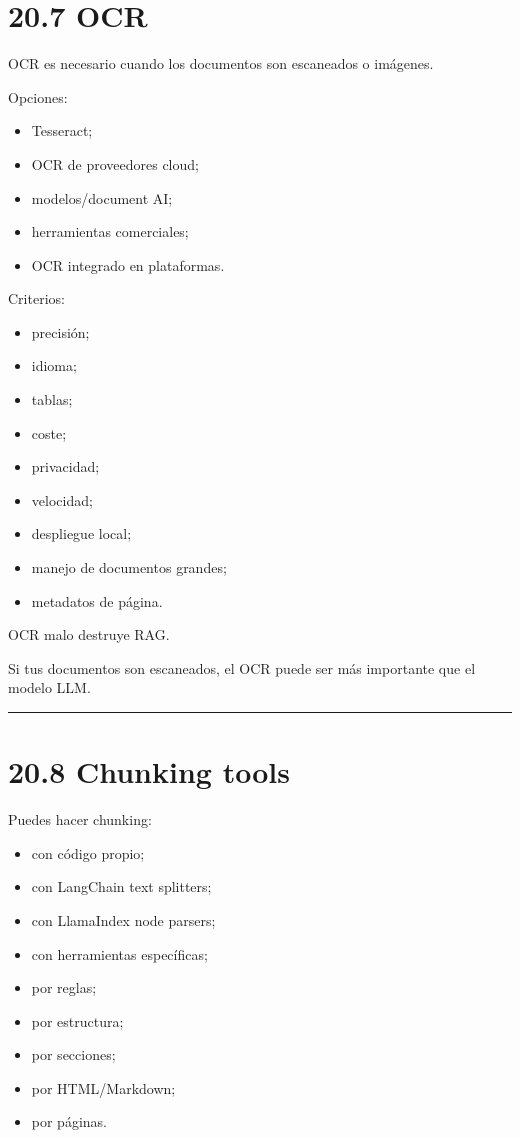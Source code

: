 \section{20.7 OCR}\label{ocr}

OCR es necesario cuando los documentos son escaneados o imágenes.

Opciones:

\begin{itemize}
\tightlist
\item
  Tesseract;
\item
  OCR de proveedores cloud;
\item
  modelos/document AI;
\item
  herramientas comerciales;
\item
  OCR integrado en plataformas.
\end{itemize}

Criterios:

\begin{itemize}
\tightlist
\item
  precisión;
\item
  idioma;
\item
  tablas;
\item
  coste;
\item
  privacidad;
\item
  velocidad;
\item
  despliegue local;
\item
  manejo de documentos grandes;
\item
  metadatos de página.
\end{itemize}

OCR malo destruye RAG.

Si tus documentos son escaneados, el OCR puede ser más importante que el
modelo LLM.

\begin{center}\rule{0.5\linewidth}{0.5pt}\end{center}

\section{20.8 Chunking tools}\label{chunking-tools}

Puedes hacer chunking:

\begin{itemize}
\tightlist
\item
  con código propio;
\item
  con LangChain text splitters;
\item
  con LlamaIndex node parsers;
\item
  con herramientas específicas;
\item
  por reglas;
\item
  por estructura;
\item
  por secciones;
\item
  por HTML/Markdown;
\item
  por páginas.
\end{itemize}

